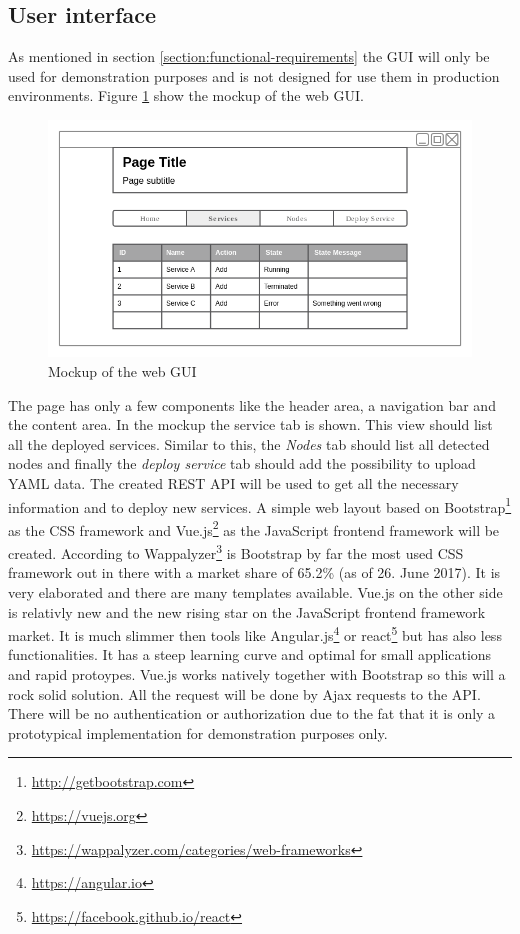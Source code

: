 \subsection{User interface}
As mentioned in section \ref{section:functional-requirements} the \ac{GUI} will only be used for demonstration purposes and is not designed for use them in production environments.
Figure \ref{fig:gui_mockup} show the mockup of the web \ac{GUI}.
\begin{figure}[H]
    \centering
    \includegraphics[width=\textwidth]{resources/images/gui_prototype.png}
    \caption[Mockup of the web \ac{GUI}]{Mockup of the web \ac{GUI}}
    \label{fig:gui_mockup}
\end{figure}
The page has only a few components like the header area, a navigation bar and the content area.
In the mockup the service tab is shown.
This view should list all the deployed services.
Similar to this, the \textit{Nodes} tab should list all detected nodes and finally the \textit{deploy service} tab should add the possibility to upload \ac{YAML} data.
The created \ac{REST} \ac{API} will be used to get all the necessary information and to deploy new services.
A simple web layout based on Bootstrap\footnote{\url{http://getbootstrap.com}} as the CSS framework and Vue.js\footnote{\url{https://vuejs.org}} as the JavaScript frontend framework will be created.
According to Wappalyzer\footnote{\url{https://wappalyzer.com/categories/web-frameworks}} is Bootstrap by far the most used \ac{CSS} framework out in there with a market share of 65.2\% (as of 26. June 2017).
It is very elaborated and there are many templates available.
Vue.js on the other side is relativly new and the new rising star on the JavaScript frontend framework market.
It is much slimmer then tools like Angular.js\footnote{\url{https://angular.io}} or react\footnote{\url{https://facebook.github.io/react}} but has also less functionalities.
It has a steep learning curve and optimal for small applications and rapid protoypes.
Vue.js works natively together with Bootstrap so this will a rock solid solution.
All the request will be done by Ajax requests to the \ac{API}.
There will be no authentication or authorization due to the fat that it is only a prototypical implementation for demonstration purposes only.


